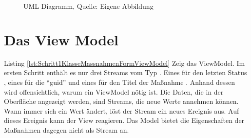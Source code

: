 \ifIncludeFigures
  \begin{figure}[h]
    \centering


    \caption[UML Diagramm]{UML Diagramm, Quelle: Eigene Abbildung}
    \label{lst:UmlOnSelet}

  \end{figure}%
\fi







\section{ Das View Model }

Listing \ref{lst:Schritt1KlasseMassnahmenFormViewModel} Zeig das ViewModel.
Im ersten Schritt enthält es nur drei Streams vom Typ .
Eines für den letzten Status , eines für die \enquote{guid}  und eines für den Titel der Maßnahme .
Anhand dessen wird offensichtlich, warum ein ViewModel nötig ist.
Die Daten, die in der Oberfläche angezeigt werden, sind Streams, die neue Werte annehmen können.
Wann immer sich ein Wert ändert, löst der Stream ein neues Ereignis aus.
Auf dieses Ereignis kann der View reagieren.
Das Model bietet die Eigenschaften der Maßnahmen dagegen nicht als Stream an.

